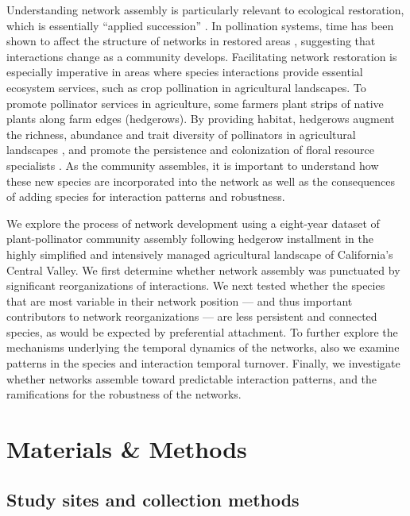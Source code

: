 \documentclass[12pt]{article}
\begin{document}
Understanding network assembly is particularly relevant to ecological
restoration, which is essentially ``applied succession''
\citep[e.g.,][]{parker1997scale}.  In pollination systems, time has
been shown to affect the structure of networks in restored areas
\citep{forup-2008-742, devoto2012understanding}, suggesting that
interactions change as a community develops. Facilitating network
restoration is especially imperative in areas where species
interactions provide essential ecosystem services, such as crop
pollination in agricultural landscapes. To promote pollinator services
in agriculture, some farmers plant strips of native plants along farm
edges (hedgerows).  By providing habitat, hedgerows augment the
richness, abundance and trait diversity of pollinators in agricultural
landscapes \citep{morandin-2013-829, kremen-2015-602,
  ponisio2015farm}, and promote the persistence and colonization of
floral resource specialists \citep{mgonigle-2015-x}. As the community
assembles, it is important to understand how these new species are
incorporated into the network as well as the consequences of adding
species for interaction patterns and robustness.

We explore the process of network development using a eight-year
dataset of plant-pollinator community assembly following hedgerow
installment in the highly simplified and intensively managed
agricultural landscape of California's Central Valley. We first
determine whether network assembly was punctuated by significant
reorganizations of interactions. We next tested whether the species
that are most variable in their network position --- and thus
important contributors to network reorganizations --- are less
persistent and connected species, as would be expected by preferential
attachment. To further explore the mechanisms underlying the temporal
dynamics of the networks, also we examine patterns in the species and
interaction temporal turnover. Finally, we investigate whether
networks assemble toward predictable interaction patterns, and the
ramifications for the robustness of the networks.

\section*{Materials \& Methods}
\label{sec:methods}

\subsection*{Study sites and collection methods}
\label{sec:study-sites}
\end{document}
